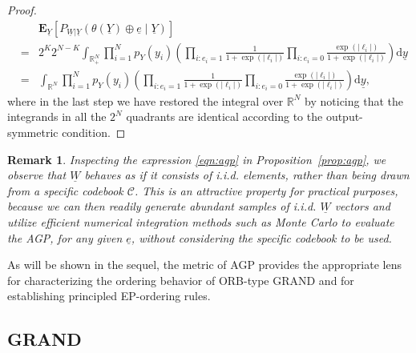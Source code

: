 \documentclass[letterpaper,draftclsnofoot,onecolumn]{IEEEtran}
\newtheorem{remark}{Remark}
\begin{document}
\begin{proof}
    \begin{eqnarray}
        && \mathbf{E}_{\underline{Y}} \left[P_{\underline{W}|\underline{Y}}(\theta(\underline{Y})\oplus \underline{e} \mid \underline{Y})\right]\\
        &=& 2^K 2^{N - K} \int_{\mathbb{R}_{+}^{N}} \prod_{i=1}^{N}p_{Y}(y_i) \left(\prod_{i:e_i = 1} \frac{1}{1+\exp(|\ell_i|)} \prod_{i:e_i = 0} \frac{\exp(|\ell_i|)} {1+\exp(|\ell_i|)}\right) \mathrm{d}\underline{y}\\
        &=& \int_{\mathbb{R}^{N}} \prod_{i=1}^{N}p_{Y}(y_i) \left(\prod_{i:e_i = 1} \frac{1}{1+\exp(|\ell_i|)} \prod_{i:e_i = 0} \frac{\exp(|\ell_i|)} {1+\exp(|\ell_i|)}\right) \mathrm{d}\underline{y},
    \end{eqnarray}
    where in the last step we have restored the integral over $\mathbb{R}^N$ by noticing that the integrands in all the $2^N$ quadrants are identical according to the output-symmetric condition.
\end{proof}

\begin{remark}
    Inspecting the expression \eqref{eqn:agp} in Proposition~\ref{prop:agp}, we observe that $\underline{W}$ behaves as if it consists of i.i.d. elements, rather than being drawn from a specific codebook $\mathcal{C}$. This is an attractive property for practical purposes, because we can then readily generate abundant samples of i.i.d. $\underline{W}$ vectors and utilize efficient numerical integration methods such as Monte Carlo to evaluate the AGP, for any given $\underline{e}$, without considering the specific codebook to be used.
\end{remark}

As will be shown in the sequel, the metric of AGP provides the appropriate lens for characterizing the ordering behavior of ORB-type GRAND and for establishing principled EP-ordering rules.

\subsection{GRAND}\label{SubSec:GRAND}
\end{document}

